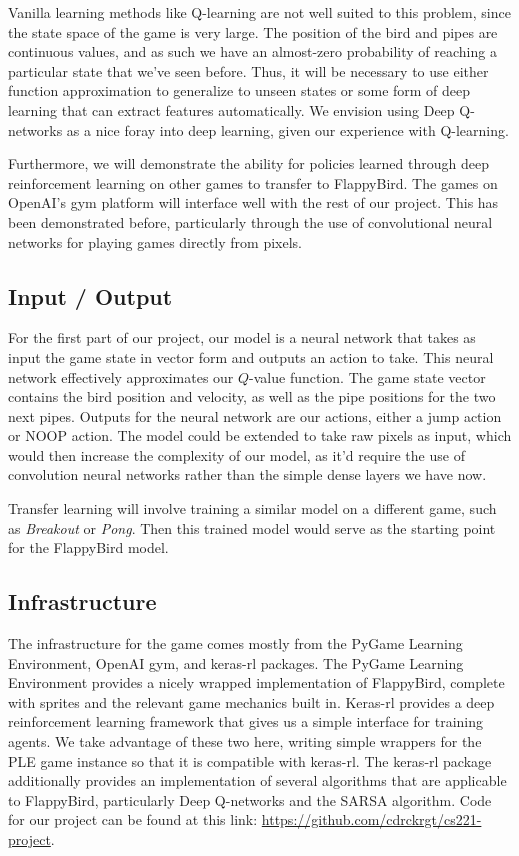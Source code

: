 \documentclass{article}
\begin{document}
Vanilla learning methods like Q-learning are not well suited to this problem, since the state space of the game is very large. The position of the bird and pipes are continuous values, and as such we have an almost-zero probability of reaching a particular state that we've seen before.
Thus, it will be necessary to use either function approximation to generalize to unseen states or some form of deep learning that can extract features automatically.
We envision using Deep Q-networks as a nice foray into deep learning, given our experience with Q-learning.

Furthermore, we will demonstrate the ability for policies learned through deep reinforcement learning on  other games to transfer to FlappyBird.
The games on OpenAI's gym platform will interface well with the rest of our project. \cite{openaigym} \cite{ale}
This has been demonstrated before, particularly through the use of convolutional neural networks for playing games directly from pixels. \cite{deepmind}


\subsection{Input / Output}

For the first part of our project, our model is a neural network that takes as input the game state in vector form and outputs an action to take. 
This neural network effectively approximates our $Q$-value function.
The game state vector contains the bird position and velocity, as well as the pipe positions for the two next pipes.
Outputs for the neural network are our actions, either a jump action or NOOP action.
The model could be extended to take raw pixels as input, which would then increase the complexity of our model, as it'd require the use of convolution neural networks rather than the simple dense layers we have now.

Transfer learning will involve training a similar model on a different game, such as \textit{Breakout} or \textit{Pong}.
Then this trained model would serve as the starting point for the FlappyBird model.

\subsection{Infrastructure}

The infrastructure for the game comes mostly from the PyGame Learning Environment, OpenAI gym, and keras-rl packages. 
The PyGame Learning Environment provides a nicely wrapped implementation of FlappyBird, complete with sprites and the relevant game mechanics built in. \cite{ple}
Keras-rl provides a deep reinforcement learning framework that gives us a simple interface for training agents. 
We take advantage of these two here, writing simple wrappers for the PLE game instance so that it is compatible with keras-rl. \cite{kerasrl}
The keras-rl package additionally provides an implementation of several algorithms that are applicable to FlappyBird, particularly Deep Q-networks and the SARSA algorithm.
Code for our project can be found at this link: \href{https://github.com/cdrckrgt/cs221-project} {https://github.com/cdrckrgt/cs221-project}.
\end{document}

